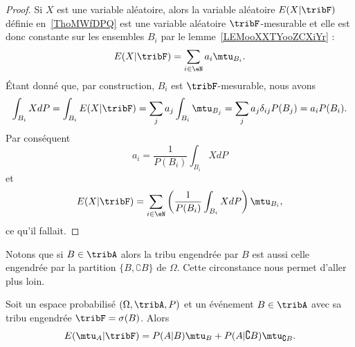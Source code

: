 \begin{proof}
    Si \( X\) est une variable aléatoire, alors la variable aléatoire \( E(X|\tribF)\) définie en~\ref{ThoMWfDPQ} est une variable aléatoire \( \tribF\)-mesurable et elle est donc constante sur les ensembles \( B_i\) par le lemme~\ref{LEMooXXTYooZCXiYr} :
    \begin{equation}
        E(X|\tribF)=\sum_{i\in\eN}a_i\mtu_{B_i}.
    \end{equation}
    Étant donné que, par construction, \( B_i\) est \( \tribF\)-mesurable, nous avons
    \begin{equation}
            \int_{B_i}XdP=\int_{B_i}E(X|\tribF)
            =\sum_ja_j\int_{B_i}\mtu_{B_j}
            =\sum_ja_j\delta_{ij}P(B_j)
            =a_iP(B_i).
    \end{equation}
    Par conséquent
    \begin{equation}
        a_i=\frac{1}{ P(B_i) }\int_{B_i}XdP
    \end{equation}
    et
    \begin{equation}
        E(X|\tribF)=\sum_{i\in \eN}\left( \frac{1}{ P(B_i) }\int_{B_i}XdP \right)\mtu_{B_i},
    \end{equation}
    ce qu'il fallait.
\end{proof}

Notons que si \( B\in\tribA\) alors la tribu engendrée par \( B\) est aussi celle engendrée par la partition \( \{ B,\complement B \}\) de \( \Omega\). Cette circonstance nous permet d'aller plus loin.

\begin{proposition}
    Soit un espace probabilisé \( (\Omega,\tribA,P)\) et un événement \( B\in\tribA\) avec sa tribu engendrée \( \tribF=\sigma(B)\). Alors
    \begin{equation}
        E(\mtu_A|\tribF)=P(A|B)\mtu_B+P(A|\complement B)\mtu_{\complement B}.
    \end{equation}
\end{proposition}

